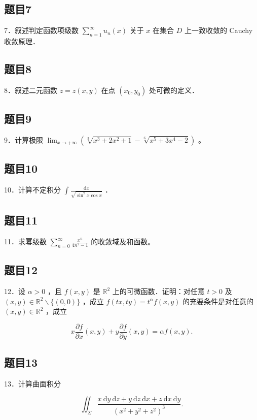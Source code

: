 \documentclass{article}
\begin{document}
\subsection{题目7}
7．叙述判定函数项级数 \(\sum_{n=1}^{\infty} u_{n}(x)\) 关于 \(x\) 在集合 \(D\) 上一致收敛的 Cauchy 收敛原理．

\subsection{题目8}
8．叙述二元函数 \(z=z(x, y)\) 在点 \(\left(x_{0}, y_{0}\right)\) 处可微的定义．

\subsection{题目9}
9．计算极限 \(\lim _{x \rightarrow+\infty}\left(\sqrt[3]{x^{3}+2 x^{2}+1}-\sqrt[6]{x^{5}+3 x^{4}-2}\right)\) 。

\subsection{题目10}
10．计算不定积分 \(\int \frac{\mathrm{d} x}{\sqrt{\sin ^{7} x \cos x}}\) ．

\subsection{题目11}
11．求幂级数 \(\sum_{n=0}^{\infty} \frac{x^{n}}{4 n^{2}-1}\) 的收敛域及和函数。

\subsection{题目12}
12．设 \(\alpha>0\) ，且 \(f(x, y)\) 是 \(\mathbb{R}^{2}\) 上的可微函数．证明：对任意 \(t>0\) 及 \((x, y) \in \mathbb{R}^{2} \backslash\{(0,0)\}\) ，成立 \(f(t x, t y)=t^{\alpha} f(x, y)\) 的充要条件是对任意的 \((x, y) \in \mathbb{R}^{2}\) ，成立

\[
x \frac{\partial f}{\partial x}(x, y)+y \frac{\partial f}{\partial y}(x, y)=\alpha f(x, y) .
\]

\subsection{题目13}
13．计算曲面积分

\[
\iint_{\Sigma} \frac{x \mathrm{~d} y \mathrm{~d} z+y \mathrm{~d} z \mathrm{~d} x+z \mathrm{~d} x \mathrm{~d} y}{\left(x^{2}+y^{2}+z^{2}\right)^{3}} .
\]
\end{document}
